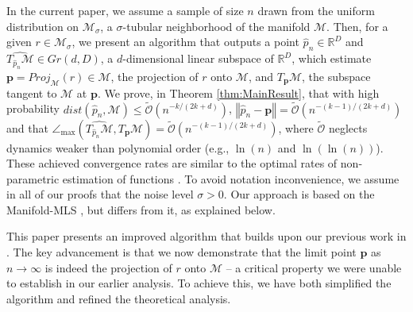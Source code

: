 \documentclass[12pt]{article}
\theoremstyle{remark}
\newcommand{\RR}{\mathbb{R}}
\newcommand{\MM}{\mathcal{M}}
\newcommand{\norm}[1]{\left\Vert #1 \right\Vert}
\newcommand{\wtilde}[1]{\widetilde{#1}}
\newcommand{\maxangle}{\angle_{\max}}
\begin{document}
In the current paper, we assume a sample of size $n$ drawn from the uniform distribution on $\MM_\sigma$, a $\sigma$-tubular neighborhood of the manifold $\MM$.
Then, for a given $ r  \in \MM_\sigma $, we present an algorithm that outputs a point $ \hat p_n\in \RR^D$ and $ \widehat{T_{\hat p_n}\MM}\in Gr(d, D) $, a $d$-dimensional linear subspace of $\RR^D$, which estimate $ \mathbf{p}= Proj_{\MM}(r)\in \MM $, the projection of $r$ onto $\MM$, and $ T_{ \mathbf{p}}\MM $, the subspace tangent to $\MM$ at $\mathbf{p}$.
We prove, in Theorem \ref{thm:MainResult}, that with high probability $dist(\hat p_n, \MM) \leq \wtilde{ \mathcal{O}}(n^{-k/(2k+d)})$,
$ \norm{\hat p_n -  \mathbf{p}} = \wtilde{\mathcal{O}}(n^{-(k-1)/(2k+d)}) $ 
and that $ \maxangle(\widehat{T_{\hat p_n}\MM}, T_{ \mathbf{p}}\MM) = \wtilde{\mathcal{O}}(n^{-(k-1)/(2k+d)}) $, 
where $ \wtilde{\mathcal{O}} $ neglects dynamics weaker than polynomial order (e.g., $ \ln(n) $ and $ \ln(\ln(n)) $).
These achieved convergence rates are similar to the optimal rates of non-parametric estimation of functions \cite{stone1980optimal}.
To avoid notation inconvenience, we assume in all of our proofs that the noise level $\sigma > 0$.
Our approach is based on the Manifold-MLS \cite{sober2016MMLS}, but differs from it, as explained below.

This paper presents an improved algorithm that builds upon our previous work in \cite{aizenbud2021non}. 
The key advancement is that we now demonstrate that the limit point $\mathbf{p}$ as $n\to \infty$ is indeed the projection of $r$ onto $\MM$ -- a critical property we were unable to establish in our earlier analysis. 
To achieve this, we have both simplified the algorithm and refined the theoretical analysis.
\end{document}
